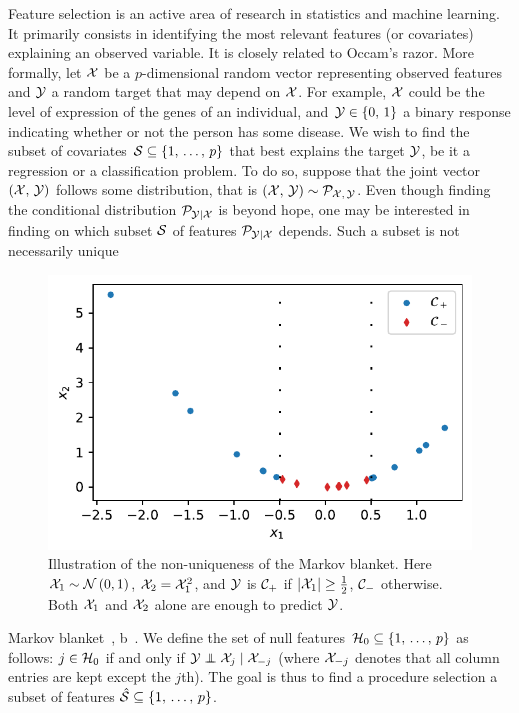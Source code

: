 Feature selection is an active area of research in statistics and machine learning.
It primarily consists in identifying the most relevant features (or covariates) explaining an observed variable.
It is closely related to Occam's razor.
More formally, let $\mathcal{X}$ be a $p$-dimensional random vector representing observed features
and $\mathcal{Y}$ a random target that may depend on $\mathcal{X}$.
For example, $\mathcal{X}$ could be the level of expression of the genes of an individual,
and $\mathcal{Y} \in \left\{ 0,\, 1 \right\}$ a binary response indicating whether or not the person has some disease.
We wish to find the subset of covariates $\mathcal{S} \subseteq \left\{ 1,\, \dots,\, p \right\}$ that best explains the target $\mathcal{Y}$,
be it a regression or a classification problem.
To do so, suppose that the joint vector $\left( \mathcal{X},\, \mathcal{Y} \right)$ follows some distribution,
that is $\left( \mathcal{X},\, \mathcal{Y} \right) \sim \mathcal{P}_{\mathcal{X},\, \mathcal{Y}}$.
Even though finding the conditional distribution $\mathcal{P}_{\mathcal{Y} \mid \mathcal{X}}$ is beyond hope,
one may be interested in finding on which subset $\mathcal{S}$ of features $\mathcal{P}_{\mathcal{Y} \mid \mathcal{X}}$ depends.
Such a subset is not necessarily unique
\begin{figure}
    \includegraphics[width=1\linewidth]{figures/fs_subset_not_unique.pdf}
    \caption{
    Illustration of the non-uniqueness of the Markov blanket.
    Here $\mathcal{X}_1 \sim \mathcal{N}\left( 0, 1 \right)$,
    $\mathcal{X}_2 = \mathcal{X}_1^2$,
    and $\mathcal{Y}$ is $\mathcal{C}_+$ if $\left\lvert\mathcal{X}_1\right\rvert \geq \frac{1}{2}$,
    $\mathcal{C}_-$ otherwise.
    Both $\mathcal{X}_1$ and $\mathcal{X}_2$ alone are enough to predict $\mathcal{Y}$.
    }
    \label{fig:fs_subset_not_unique}
\end{figure}
Markov blanket~\cite{markov_blanket}, b~\cite{markov_blanket_fs}.
We define the set of null features $\mathcal{H}_0 \subseteq \left\{ 1,\, \dots,\, p \right\}$ as follows:
$j \in \mathcal{H}_0$ if and only if $\cY \independent \cX_j \mid \cX_{-j}$
(where $\mathcal{X}_{-j}$ denotes that all column entries are kept except the $j$th).
The goal is thus to find a procedure selection a subset of features
$\hat{\mathcal{S}} \subseteq \left\{ 1,\, \dots,\, p \right\}$.

